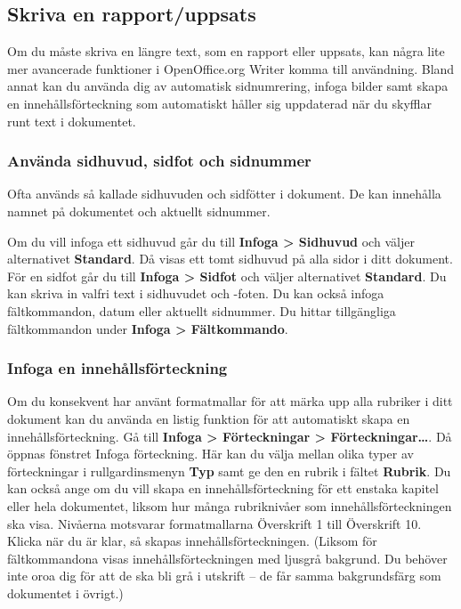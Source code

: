 \documentclass[a4paper,final]{memoir} %
\begin{document}
\subsection{Skriva en rapport/uppsats}\label{sec:rapport}

Om du måste skriva en längre text, som en rapport eller uppsats, kan några lite mer avancerade funktioner i OpenOffice.org Writer komma till användning. Bland annat kan du använda dig av automatisk sidnumrering, infoga bilder samt skapa en innehållsförteckning som automatiskt håller sig uppdaterad när du skyfflar runt text i dokumentet.

\subsubsection{Använda sidhuvud, sidfot och sidnummer}


Ofta används så kallade sidhuvuden och sidfötter i dokument. De kan innehålla namnet på dokumentet och aktuellt sidnummer.

Om du vill infoga ett sidhuvud går du till \textbf{Infoga \textgreater{} Sidhuvud} och väljer alternativet \textbf{Standard}. Då visas ett tomt sidhuvud på alla sidor i ditt dokument. För en sidfot går du till \textbf{Infoga \textgreater{} Sidfot} och väljer alternativet \textbf{Standard}. Du kan skriva in valfri text i sidhuvudet och -foten. Du kan också infoga fältkommandon, datum eller aktuellt sidnummer. Du hittar tillgängliga fältkommandon under \textbf{Infoga \textgreater{} Fältkommando}.

\subsubsection{Infoga en innehållsförteckning}


Om du konsekvent har använt formatmallar för att märka upp alla rubriker i ditt dokument kan du använda en listig funktion för att automatiskt skapa en innehållsförteckning. Gå till \textbf{Infoga \textgreater{} Förteckningar \textgreater{} Förteckningar\ldots{}}. Då öppnas fönstret Infoga förteckning. Här kan du välja mellan olika typer av förteckningar i rullgardinsmenyn \textbf{Typ} samt ge den en rubrik i fältet \textbf{Rubrik}. Du kan också ange om du vill skapa en innehållsförteckning för ett enstaka kapitel eller hela dokumentet, liksom hur många rubriknivåer som innehållsförteckningen ska visa. Nivåerna motsvarar formatmallarna Överskrift 1 till Överskrift 10. Klicka \xok{} när du är klar, så skapas innehållsförteckningen. (Liksom för fältkommandona visas innehållsförteckningen med ljusgrå bakgrund. Du behöver inte oroa dig för att de ska bli grå i utskrift -- de får samma bakgrundsfärg som dokumentet i övrigt.)
\end{document}
